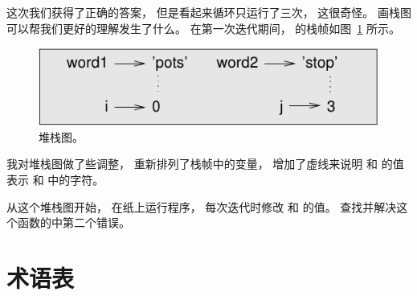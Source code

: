 %

这次我们获得了正确的答案， 但是看起来循环只运行了三次， 这很奇怪。  画栈图可以帮我们更好的理解发生了什么。  在第一次迭代期间，  的栈帧如图~\ref{fig.state4} 所示。

\begin{figure}
\centerline
{\includegraphics[scale=0.8]{../source/figs/state4.pdf}}
\caption{堆栈图。  }
\label{fig.state4}
\end{figure}


我对堆栈图做了些调整， 重新排列了栈帧中的变量， 增加了虚线来说明  和  的值表示  和  中的字符。



从这个堆栈图开始， 在纸上运行程序， 每次迭代时修改  和  的值。  查找并解决这个函数的中第二个错误。
\label{isreverse}


\section{术语表}

